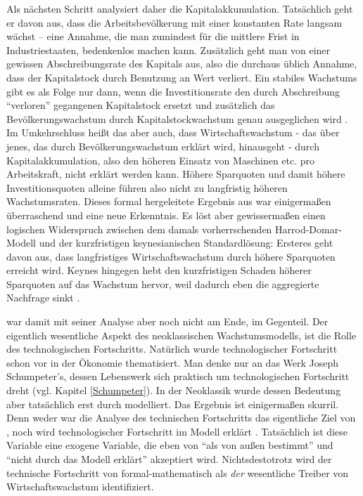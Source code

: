 Als nächsten Schritt analysiert \textcite{Solow1956} daher die Kapitalakkumulation. Tatsächlich geht er davon aus, dass die Arbeitsbevölkerung mit einer konstanten Rate langsam wächst – eine Annahme, die man zumindest für die mittlere Frist in Industriestaaten, bedenkenlos machen kann. Zusätzlich geht man von einer gewissen Abschreibungsrate des Kapitals aus, also die durchaus üblich Annahme, dass der Kapitalstock durch Benutzung an Wert verliert. Ein stabiles Wachstums gibt es als Folge nur dann, wenn die Investitionsrate den durch Abschreibung "`verloren"' gegangenen Kapitalstock ersetzt und zusätzlich das Bevölkerungswachstum durch Kapitalstockwachstum genau ausgeglichen wird \parencite[S. 73]{Solow1956}. Im Umkehrschluss heißt das aber auch, dass Wirtschaftswachstum - das über jenes, das durch Bevölkerungswachstum erklärt wird, hinausgeht - durch Kapitalakkumulation, also den höheren Einsatz von Maschinen etc. pro Arbeitskraft, nicht erklärt werden kann. Höhere Sparquoten und damit höhere Investitionsquoten alleine führen also nicht zu langfristig höheren Wachstumsraten. Dieses formal hergeleitete Ergebnis aus \textcite{Solow1956} war einigermaßen überraschend und eine neue Erkenntnis. Es löst aber gewissermaßen einen logischen Widerspruch zwischen dem damals vorherrschenden Harrod-Domar-Modell und der kurzfristigen keynesianischen Standardlösung: Ersteres geht davon aus, dass langfristiges Wirtschaftswachstum durch höhere Sparquoten erreicht wird. Keynes hingegen hebt den kurzfristigen Schaden höherer Sparquoten auf das Wachstum hervor, weil dadurch eben die aggregierte Nachfrage sinkt \parencite[S. 612]{Snowdon2005}.

\textcite{Solow1956} war damit mit seiner Analyse aber noch nicht am Ende, im Gegenteil. Der eigentlich wesentliche Aspekt des neoklassischen Wachstumsmodells, ist die Rolle des technologischen Fortschritts. Natürlich wurde technologischer Fortschritt schon vor \textcite{Solow1956} in der Ökonomie thematisiert. Man denke nur an das Werk Joseph Schumpeter's, dessen Lebenswerk sich praktisch um technologischen Fortschritt dreht (vgl. Kapitel \ref{Schumpeter}). In der Neoklassik wurde dessen Bedeutung aber tatsächlich erst durch \textcite[S. 85ff]{Solow1956} modelliert. Das Ergebnis ist einigermaßen skurril. Denn weder war die Analyse des technischen Fortschritts das eigentliche Ziel von \textcite{Solow1956}, noch wird technologischer Fortschritt im Modell erklärt \parencite[S. 610]{Snowdon2005}. Tatsächlich ist diese Variable eine exogene Variable, die eben von "`als von außen bestimmt"' und "`nicht durch das Modell erklärt"' akzeptiert wird. Nichtsdestotrotz wird der technische Fortschritt von \textcite{Solow1956} formal-mathematisch als \textit{der} wesentliche Treiber von Wirtschaftswachstum identifiziert.

